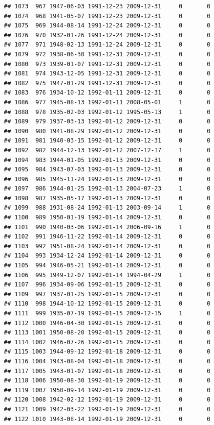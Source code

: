 \documentclass[
]{book}
\begin{document}
\begin{verbatim}
## 1073  967 1947-06-03 1991-12-23 2009-12-31     0       0
## 1074  968 1941-05-07 1991-12-23 2009-12-31     0       0
## 1075  969 1944-08-14 1991-12-24 2009-12-31     0       0
## 1076  970 1932-01-26 1991-12-24 2009-12-31     0       0
## 1077  971 1948-02-13 1991-12-24 2009-12-31     0       0
## 1079  972 1938-06-30 1991-12-31 2009-12-31     0       0
## 1080  973 1939-01-07 1991-12-31 2009-12-31     0       0
## 1081  974 1943-12-05 1991-12-31 2009-12-31     0       0
## 1082  975 1947-01-29 1991-12-31 2009-12-31     0       0
## 1083  976 1934-10-12 1992-01-11 2009-12-31     0       0
## 1086  977 1945-08-13 1992-01-11 2008-05-01     1       0
## 1088  978 1935-02-03 1992-01-12 1995-05-13     1       0
## 1089  979 1937-03-13 1992-01-12 2009-12-31     0       0
## 1090  980 1941-08-29 1992-01-12 2009-12-31     0       0
## 1091  981 1940-03-15 1992-01-12 2009-12-31     0       0
## 1092  982 1944-12-13 1992-01-12 2007-12-17     1       0
## 1094  983 1944-01-05 1992-01-13 2009-12-31     0       0
## 1095  984 1943-07-03 1992-01-13 2009-12-31     0       0
## 1096  985 1945-11-24 1992-01-13 2009-12-31     0       0
## 1097  986 1944-01-25 1992-01-13 2004-07-23     1       0
## 1098  987 1935-05-17 1992-01-13 2009-12-31     0       0
## 1099  988 1931-08-24 1992-01-13 2003-09-14     1       0
## 1100  989 1950-01-19 1992-01-14 2009-12-31     0       0
## 1101  990 1940-03-06 1992-01-14 2006-09-16     1       0
## 1102  991 1946-11-22 1992-01-14 2009-12-31     0       0
## 1103  992 1951-08-24 1992-01-14 2009-12-31     0       0
## 1104  993 1934-12-24 1992-01-14 2009-12-31     0       0
## 1105  994 1946-05-21 1992-01-14 2009-12-31     0       0
## 1106  995 1949-12-07 1992-01-14 1994-04-29     1       0
## 1107  996 1934-09-06 1992-01-15 2009-12-31     0       0
## 1109  997 1937-01-25 1992-01-15 2009-12-31     0       0
## 1110  998 1944-10-12 1992-01-15 2009-12-31     0       0
## 1111  999 1935-07-19 1992-01-15 2009-12-15     1       0
## 1112 1000 1946-04-30 1992-01-15 2009-12-31     0       0
## 1113 1001 1950-08-20 1992-01-15 2009-12-31     0       0
## 1114 1002 1946-07-26 1992-01-15 2009-12-31     0       0
## 1115 1003 1944-09-12 1992-01-18 2009-12-31     0       0
## 1116 1004 1943-08-04 1992-01-18 2009-12-31     0       0
## 1117 1005 1943-01-07 1992-01-18 2009-12-31     0       0
## 1118 1006 1950-08-30 1992-01-19 2009-12-31     0       0
## 1119 1007 1950-09-14 1992-01-19 2009-12-31     0       0
## 1120 1008 1942-02-12 1992-01-19 2009-12-31     0       0
## 1121 1009 1942-03-22 1992-01-19 2009-12-31     0       0
## 1122 1010 1943-08-14 1992-01-19 2009-12-31     0       0

\end{verbatim}
\end{document}
